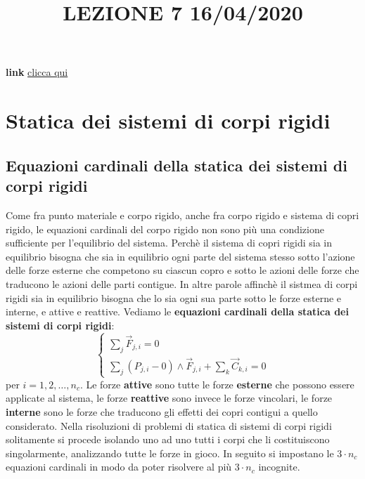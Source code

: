 \title{LEZIONE 7 16/04/2020}\newline
\textbf{link} \href{https://web.microsoftstream.com/video/16847746-6bdf-4d6b-bcbb-e5829a862801}{clicca qui}
\section{Statica dei sistemi di corpi rigidi}
\subsection{Equazioni cardinali della statica dei sistemi di corpi rigidi}
Come fra punto materiale e corpo rigido, anche fra corpo rigido e sistema di copri rigido, le equazioni cardinali del corpo rigido non sono più una condizione sufficiente per l'equilibrio del sistema.\newline
\newline
Perchè il sistema di copri rigidi sia in equilibrio bisogna che sia in equilibrio ogni parte del sistema stesso sotto l'azione delle forze esterne che competono su ciascun copro e sotto le azioni delle forze che traducono le azioni delle parti contigue. In altre parole affinchè il sistmea di corpi rigidi sia in equilibrio bisogna che lo sia ogni sua parte sotto le forze esterne e interne, e attive e reattive. \newline
\newline
Vediamo le \textbf{equazioni cardinali della statica dei sistemi di corpi rigidi}:
\[
    \begin{cases}
        \sum_{j} \vec{F}_{j,i} = 0\\
        \sum_{j} (P_{j,i} - 0) \land \vec{F}_{j,i} + \sum_{k} \vec{C}_{k,i} = 0
    \end{cases}
\]
per $i = 1,2,\dots, n_c$.\newline
\newline
Le forze \textbf{attive} sono tutte le forze \textbf{esterne} che possono essere applicate al sistema, le forze \textbf{reattive} sono invece le forze vincolari, le forze \textbf{interne} sono le forze che traducono gli effetti dei copri contigui a quello considerato.\newline
\newline
Nella risoluzioni di problemi di statica di sistemi di corpi rigidi solitamente si procede isolando uno ad uno tutti i corpi che li costituiscono singolarmente, analizzando tutte le forze in gioco. In seguito si impostano le $3 \cdot n_c$ equazioni cardinali in modo da poter risolvere al più $3 \cdot n_c$ incognite.\newline
